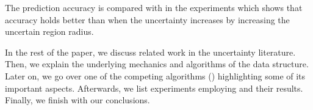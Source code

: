 The \pf prediction accuracy is compared with \tpr in the experiments which shows that \pf accuracy holds better than \tpr when the uncertainty increases by increasing the uncertain region radius.


In the rest of the paper, we discuss related work in the uncertainty literature. Then, we explain the underlying mechanics and algorithms of the \pf data structure. Later on, we go over one of the competing algorithms (\tpr) highlighting some of its important aspects. Afterwards, we list experiments employing \pf and their results. Finally, we finish with our conclusions.

